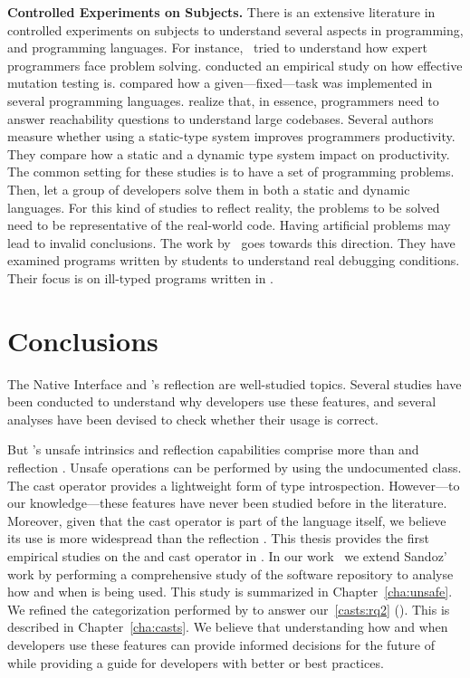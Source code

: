 \textbf{Controlled Experiments on Subjects.}
There is an extensive literature \perse{} in controlled experiments on subjects to understand several aspects in programming, and programming languages.
For instance,~\cite{solowayEmpiricalStudiesProgramming1984} tried to understand how expert programmers face problem solving.
\cite{buddTheoreticalEmpiricalStudies1980} conducted an empirical study on how effective mutation testing is.
\cite{precheltEmpiricalComparisonSeven2000} compared how a given---fixed---task was implemented in several programming languages.
\cite{latozaDevelopersAskReachability2010} realize that, in essence, programmers need to answer reachability questions to understand large codebases.
Several authors~\cite{stuchlikStaticVsDynamic2011,mayerEmpiricalStudyInfluence2012,harlinImpactUsingStaticType2017} measure whether using a static-type system improves programmers productivity.
They compare how a static and a dynamic type system impact on productivity.
The common setting for these studies is to have a set of programming problems.
Then, let a group of developers solve them in both a static and dynamic languages.
For this kind of studies to reflect reality, the problems to be solved need to be representative of the real-world code.
Having artificial problems may lead to invalid conclusions.
The work by~\cite{wuHowTypeErrors2017,wuLearningUserFriendly2017} goes towards this direction. 
They have examined programs written by students to understand real debugging conditions. 
Their focus is on ill-typed programs written in \haskell{}.

\section{Conclusions}
\label{sec:literature-review:conclusions}

The \java{} Native Interface and \java{}'s reflection \api{} are well-studied topics.
Several studies have been conducted to understand why developers use these features,
and several analyses have been devised to check whether their usage is correct.

But \java{}'s unsafe intrinsics and reflection capabilities comprise more than \jni{} and reflection \api{}.
Unsafe operations can be performed by using the undocumented \smu{} class.
The cast operator provides a lightweight form of type introspection.
However---to our knowledge---these features have never been studied before in the literature.
Moreover,
given that the cast operator is part of the \java{} language itself,
we believe its use is more widespread than the reflection \api{}.
This thesis provides the first empirical studies on the \unsafe{} \api{} and cast operator in \java{}.
In our work~\citep{mastrangeloUseYourOwn2015} we extend Sandoz' work
by performing a comprehensive study of the \mavencentral{}
software repository to analyse how and when \smu{} is being used.
This study is summarized in Chapter~\ref{cha:unsafe}.
We refined the categorization performed by \cite{wintherGuardedTypePromotion2011} to answer our~\ref{casts:rq2} (\emph{\crqB}).
This is described in Chapter~\ref{cha:casts}.
We believe that understanding how and when developers use these features can provide informed decisions for the future of \java{} while providing a guide for developers with better or best practices.
